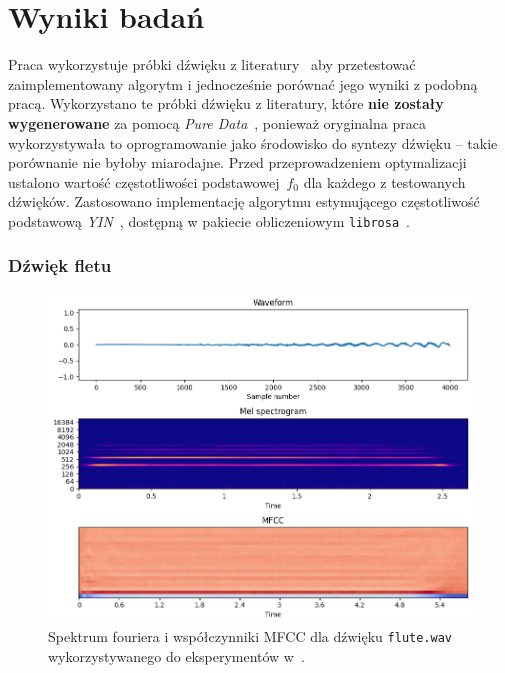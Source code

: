 \chapter{Wyniki badań}\label{chap:research}



Praca wykorzystuje próbki dźwięku z literatury~\cite{evolutionary_puredata_results}
aby przetestować zaimplementowany algorytm i jednocześnie porównać jego wyniki
z podobną pracą. Wykorzystano te próbki dźwięku
z literatury, które \textbf{nie zostały wygenerowane} za pomocą
\textit{Pure Data}~\cite{pure_data}, ponieważ oryginalna praca wykorzystywała
to oprogramowanie jako środowisko do syntezy dźwięku -- takie porównanie
nie byłoby miarodajne.
Przed przeprowadzeniem optymalizacji ustalono wartość częstotliwości podstawowej~$f_0$
dla każdego z testowanych dźwięków. Zastosowano implementację algorytmu
estymującego częstotliwość podstawową
\textit{YIN}~\cite{yin_pitch_estimation}, dostępną w pakiecie obliczeniowym
\texttt{librosa}~\cite{librosa}.

\subsection{Dźwięk fletu}

\begin{figure}[H]
    \centering
    \includegraphics[width=0.7\linewidth]{rys06/target_sample_flute_literature.png}
    \caption{
      Spektrum fouriera i współczynniki MFCC dla dźwięku \texttt{flute.wav} wykorzystywanego
      do eksperymentów w~\cite{evolutionary_puredata_results}.
    }\label{fig:literature_flute_sound_overview}
\end{figure}

